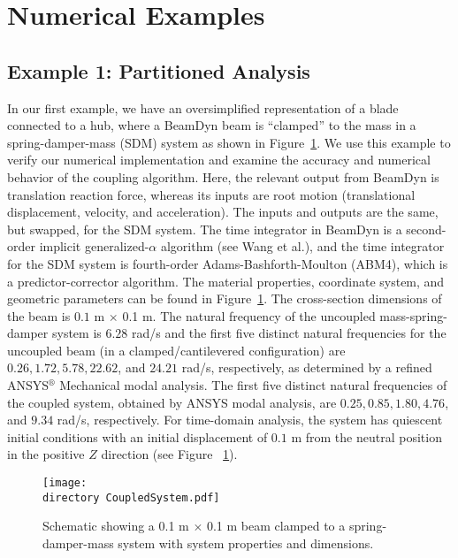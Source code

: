 \documentclass{aiaa-tc}
\def\directory{EPSF/}
\begin{document}
 
\section{Numerical Examples}
 
\subsection{Example 1: Partitioned Analysis}

In our first example, we have an oversimplified representation of a blade connected to a hub, where
a BeamDyn beam is ``clamped'' to the mass in a spring-damper-mass (SDM) system as shown in Figure~\ref{fig:CoupledSystem}.     
We use this example to verify our numerical implementation and examine the accuracy and numerical behavior of the coupling algorithm. 
Here, the relevant output from BeamDyn is translation reaction force, whereas its inputs are root motion (translational displacement, velocity, and acceleration).  
The inputs and outputs are the same, but swapped, for the SDM system.
The time integrator in BeamDyn is a second-order implicit generalized-$\alpha$ algorithm (see Wang et al.\cite{Wang:2014}), and the time integrator for the SDM system is fourth-order Adams-Bashforth-Moulton (ABM4), which is a predictor-corrector algorithm.
The material properties, coordinate system, and geometric parameters can be found in Figure~\ref{fig:CoupledSystem}. 
The cross-section dimensions of the beam is $0.1$ m $\times$ 0.1 m. 
The natural frequency of the uncoupled mass-spring-damper system is $6.28$ rad/s and the first five distinct natural frequencies for the uncoupled beam (in a clamped/cantilevered configuration) are $0.26, 1.72, 5.78, 22.62$, and $24.21$ rad/s, respectively, as determined by a refined ANSYS$^{\circledR}$ Mechanical modal analysis. 
The first five distinct natural frequencies of the coupled system, obtained by ANSYS modal analysis, are $0.25, 0.85, 1.80, 4.76$, and $9.34$ rad/s, respectively.
For time-domain analysis, the system has quiescent initial conditions with an initial displacement of $0.1$ m from the neutral position in the positive $Z$ direction (see Figure ~\ref{fig:CoupledSystem}). 

\begin{figure}
\centering
\texttt{[image: \\directory CoupledSystem.pdf]}
\caption{Schematic showing a 0.1 m $\times$ 0.1 m beam clamped to a spring-damper-mass system with system properties and dimensions.} 
\label{fig:CoupledSystem}
\end{figure}
 
\end{document}
